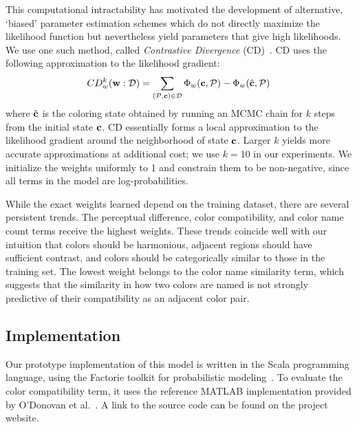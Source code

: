 This computational intractability has motivated the development of alternative, `biased' parameter estimation schemes which do not directly maximize the likelihood function but nevertheless yield parameters that give high likelihoods. We use one such method, called \emph{Contrastive Divergence} (CD)~\cite{ContrastiveDivergence}. CD uses the following approximation to the likelihood gradient:
\begin{equation*}
CD^k_w(\mathbf{w} : \mathcal{D}) = 
	\sum_{(\mathcal{P}, \mathbf{c}) \in \mathcal{D}}
			\Phi_w(\mathbf{c}, \mathcal{P})
		 -\Phi_w(\hat{\mathbf{c}}, \mathcal{P})
\end{equation*}
where $\hat{\mathbf{c}}$ is the coloring state obtained by running an MCMC chain for $k$ steps from the initial state $\mathbf{c}$. CD essentially forms a local approximation to the likelihood gradient around the neighborhood of state $\mathbf{c}$. Larger $k$ yields more accurate approximations at additional cost; we use $k = 10$ in our experiments. We initialize the weights uniformly to 1 and constrain them to be non-negative, since all terms in the model are log-probabilities.

While the exact weights learned depend on the training dataset, there are several persistent trends.
The perceptual difference, color compatibility, and color name count terms receive the highest weights. These trends coincide well with our intuition that colors should be harmonious, adjacent regions should have sufficient contrast, and colors should be categorically similar to those in the training set.
The lowest weight belongs to the color name similarity term, which suggests that the similarity in how two colors are named is not strongly predictive of their compatibility as an adjacent color pair.

\subsection{Implementation}
\label{sec:implementation}

Our prototype implementation of this model is written in the Scala programming language, using the Factorie toolkit for probabilistic modeling~\cite{Factorie}. To evaluate the color compatibility term, it uses the reference MATLAB implementation provided by O'Donovan et al.~. A link to the source code can be found on the project website.